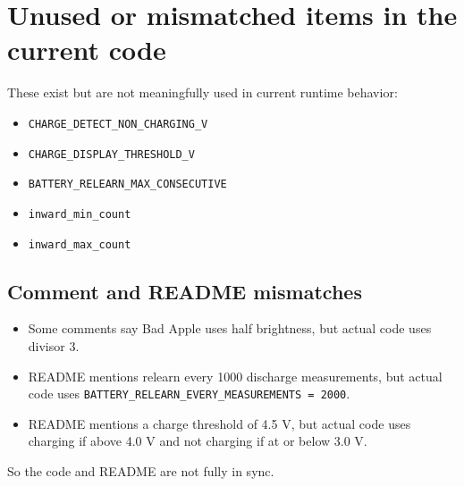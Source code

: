 \documentclass[11pt]{article}
\begin{document}
\section{Unused or mismatched items in the current code}
These exist but are not meaningfully used in current runtime behavior:
\begin{itemize}
  \item \texttt{CHARGE\_DETECT\_NON\_CHARGING\_V}
  \item \texttt{CHARGE\_DISPLAY\_THRESHOLD\_V}
  \item \texttt{BATTERY\_RELEARN\_MAX\_CONSECUTIVE}
  \item \texttt{inward\_min\_count}
  \item \texttt{inward\_max\_count}
\end{itemize}

\subsection{Comment and README mismatches}
\begin{itemize}
  \item Some comments say Bad Apple uses half brightness, but actual code uses divisor 3.
  \item README mentions relearn every 1000 discharge measurements, but actual code uses \texttt{BATTERY\_RELEARN\_EVERY\_MEASUREMENTS = 2000}.
  \item README mentions a charge threshold of 4.5 V, but actual code uses charging if above 4.0 V and not charging if at or below 3.0 V.
\end{itemize}

So the code and README are not fully in sync.
\end{document}

